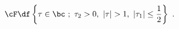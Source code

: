 \begin{equation}
\cF \df \left\{\tau \in \bc~;~ \tau_2>0,~|\tau|>1,~ 
|\tau_1|\leq \frac{1}{2}\right\}~.
\end{equation}

